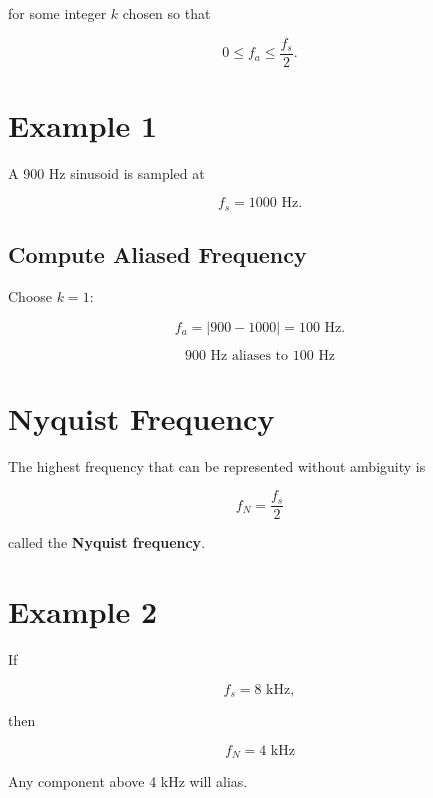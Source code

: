 for some integer \(k\) chosen so that

\[
0\le f_a\le \frac{f_s}{2}.
\]


\section{Example 1}

A 900 Hz sinusoid is sampled at

\[
f_s=1000\text{ Hz}.
\]


\subsection{Compute Aliased Frequency}

Choose \(k=1\):

\[
f_a=|900-1000|=100\text{ Hz}.
\]

\[
\boxed{
900\text{ Hz aliases to }100\text{ Hz}
}
\]


\section{Nyquist Frequency}

The highest frequency that can be represented without ambiguity is

\[
\boxed{
f_N=\frac{f_s}{2}
}
\]

called the \textbf{Nyquist frequency}.


\section{Example 2}

If

\[
f_s=8\text{ kHz},
\]

then

\[
\boxed{
f_N=4\text{ kHz}
}
\]

Any component above 4 kHz will alias.


